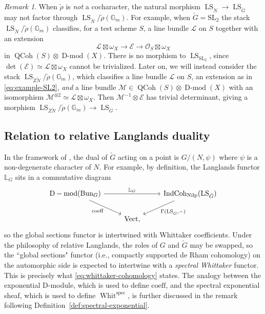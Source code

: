 \documentclass[11pt]{amsart}
\newcommand{\bG}{\mathbb{G}}
\newcommand{\cL}{{\mathcal L}}
\newcommand{\cM}{{\mathcal M}}
\newcommand{\cO}{{\mathcal O}}
\newcommand{\cE}{\mathcal{E}}
\newcommand{\spec}{\mathrm{spec}}
\newcommand{\Vect}{\operatorname{Vect}}
\newcommand{\SL}{{\mathrm{SL}}}
\newcommand{\Bun}{{\mathrm{Bun}}}
\newcommand{\Whit}{\operatorname{Whit}}
\newcommand{\Nilp}{\mathrm{Nilp}}
\DeclareMathOperator{\QCoh}{QCoh}
\DeclareMathOperator{\Dmod}{D-mod}
\DeclareMathOperator{\IndCoh}{IndCoh}
\DeclareMathOperator{\LS}{LS}
\theoremstyle{remark}
\newtheorem*{remark}{Remark}
\theoremstyle{definition}
\begin{document}
\begin{remark}
    When $\check\rho$ is \emph{not} a cocharacter, the natural morphism $\LS_{\check N}\to\LS_{\check G}$ may not factor through $\LS_{\check N}/\check\rho(\bG_m)$. For example, when $\check G=\SL_2$ the stack $\LS_{\check N}/\check\rho(\bG_m)$ classifies, for a test scheme $S$, a line bundle $\cL$ on $S$ together with an extension
    \begin{equation}\label{eq:example-SL2}
    \cL\boxtimes\omega_X\to \cE\to \cO_S\boxtimes\omega_X
    \end{equation}
    in $\QCoh(S)\otimes\Dmod(X)$. There is no morphism to $\LS_{\SL_2}$, since $\det(\cE)\simeq \cL\boxtimes\omega_X$ cannot be trivialized. Later on, we will instead consider the stack $\LS_{\check Z\check N}/\check\rho(\bG_m)$, which classifies a line bundle $\cL$ on $S$, an extension as in \eqref{eq:example-SL2}, \emph{and} a line bundle $\cM\in\QCoh(S)\otimes\Dmod(X)$ with an isomorphism $\cM^{\otimes 2}\simeq \cL\boxtimes\omega_X$. Then $\cM^{-1}\otimes\cE$ has trivial determinant, giving a morphism $\LS_{\check Z\check N}/\check\rho(\bG_m)\to\LS_{\check G}$.  
\end{remark}

\subsection{Relation to relative Langlands duality} In the framework of \cite{relative-langlands}, the dual of $\check G$ acting on a point is $G/(N,\psi)$ where $\psi$ is a non-degenerate character of $N$. For example, by definition, the Langlands functor $\mathbb L_G$ sits in a commutative diagram
\[
\begin{tikzcd}
    \Dmod(\Bun_G)\arrow{rr}{\mathbb L_G}\arrow[swap]{dr}{\mathrm{coeff}}&&\IndCoh_\Nilp(\LS_{\check G})\arrow{dl}{\Gamma(\LS_{\check G},-)}\\
    &\Vect,
\end{tikzcd}
\]
so the global sections functor is intertwined with Whittaker coefficients. Under the philosophy of relative Langlands, the roles of $G$ and $\check G$ may be swapped, so the ``global sections" functor (i.e., compactly supported de Rham cohomology) on the automorphic side is expected to intertwine with a \emph{spectral Whittaker} functor. This is precisely what \eqref{eq:whittaker-cohomology} states. The analogy between the exponential D-module, which is used to define $\mathrm{coeff}$, and the spectral exponential sheaf, which is used to define $\Whit^\spec$, is further discussed in the remark following Definition~\ref{def:spectral-exponential}.
\end{document}
